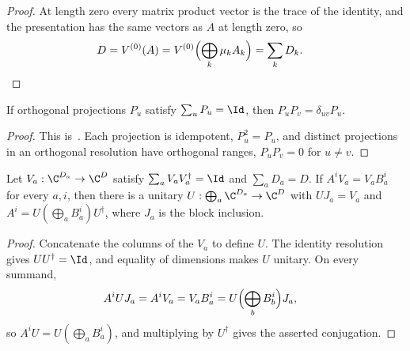 \begin{proof}
    \leanok
    At length zero every matrix product vector is the trace of the identity,
    and the presentation has the same vectors as $A$ at length zero, so
    \begin{align}
        D & =V^{(0)}(A)=V^{(0)}\Bigl(\bigoplus_k\mu_kA_k\Bigr)=\sum_kD_k. \notag
    \end{align}
\end{proof}


\begin{lemma}
    \label{thm:periodic_orthogonal_resolution_multiplication}
    \leanok
    If orthogonal projections $P_u$ satisfy $\sum_u P_u=\Id$, then
    $P_uP_v=\delta_{uv}P_u$.
\end{lemma}

\begin{proof}
    \leanok
    This is~\cite[``Multiplication of an orthogonal
        resolution'']{QICLean2026Blueprint}.
    Each projection is idempotent, $P_u^2=P_u$, and distinct projections in an
    orthogonal resolution have orthogonal ranges, $P_uP_v=0$ for $u\ne v$.
\end{proof}

\begin{lemma}
    \label{thm:periodic_unitary_resolution}
    \leanok
    Let $V_a:\C^{D_a}\to\C^D$ satisfy
    $\sum_a V_aV_a^\dagger=\Id$ and $\sum_a D_a=D$.
    If $A^iV_a=V_aB_a^i$ for every $a,i$, then there is a unitary
    $U:\bigoplus_a\C^{D_a}\to\C^D$ with $UJ_a=V_a$ and
    $A^i=U(\bigoplus_a B_a^i)U^\dagger$, where $J_a$ is the block inclusion.
\end{lemma}

\begin{proof}
    \leanok
    Concatenate the columns of the $V_a$ to define $U$. The identity resolution
    gives $UU^\dagger=\Id$, and equality of dimensions makes $U$ unitary.
    On every summand,
    \begin{align}
        A^iUJ_a & =A^iV_a=V_aB_a^i=U\Bigl(\bigoplus_bB_b^i\Bigr)J_a, \notag
    \end{align}
    so $A^iU=U(\bigoplus_aB_a^i)$, and multiplying by $U^\dagger$ gives the
    asserted conjugation.
\end{proof}


